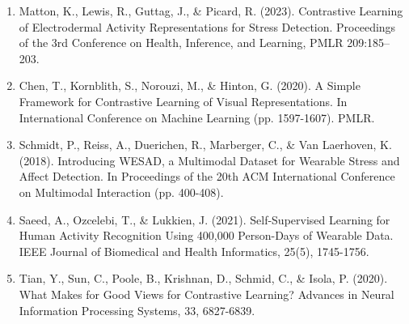 \documentclass[10pt,letterpaper,twocolumn]{article}
\begin{document}
\begin{enumerate}
    \item Matton, K., Lewis, R., Guttag, J., \& Picard, R. (2023). Contrastive Learning of Electrodermal Activity Representations for Stress Detection. Proceedings of the 3rd Conference on Health, Inference, and Learning, PMLR 209:185–203.
    
    \item Chen, T., Kornblith, S., Norouzi, M., \& Hinton, G. (2020). A Simple Framework for Contrastive Learning of Visual Representations. In International Conference on Machine Learning (pp. 1597-1607). PMLR.
    
    \item Schmidt, P., Reiss, A., Duerichen, R., Marberger, C., \& Van Laerhoven, K. (2018). Introducing WESAD, a Multimodal Dataset for Wearable Stress and Affect Detection. In Proceedings of the 20th ACM International Conference on Multimodal Interaction (pp. 400-408).
    
    \item Saeed, A., Ozcelebi, T., \& Lukkien, J. (2021). Self-Supervised Learning for Human Activity Recognition Using 400,000 Person-Days of Wearable Data. IEEE Journal of Biomedical and Health Informatics, 25(5), 1745-1756.
    
    \item Tian, Y., Sun, C., Poole, B., Krishnan, D., Schmid, C., \& Isola, P. (2020). What Makes for Good Views for Contrastive Learning? Advances in Neural Information Processing Systems, 33, 6827-6839.
\end{enumerate}
\end{document}
